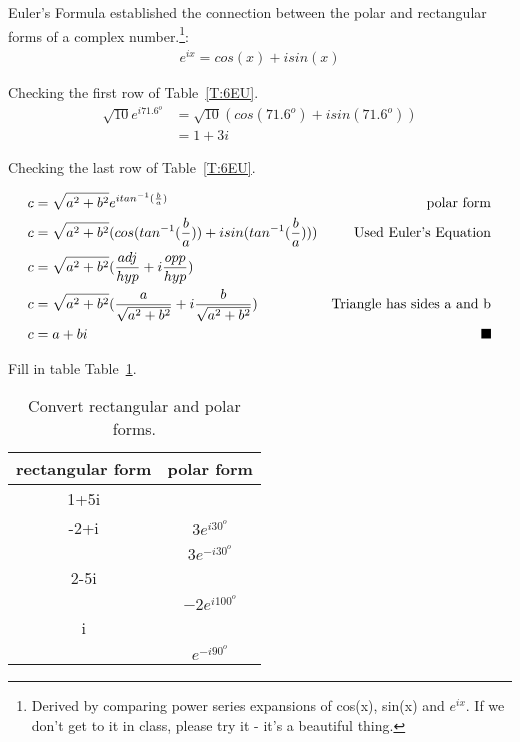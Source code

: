 Euler's Formula established the connection between the polar and rectangular forms of a complex number.\footnote{Derived by comparing power series expansions of cos(x), sin(x) and $e^{ix}$. If we don't get to it in class, please try it - it's a beautiful thing.}:
\begin{align}
 e^{ix}=cos(x)+isin(x) \tag{Euler's Formula}
\end{align}

Checking the first row of Table~\ref{T:6EU}.
\begin{align*}
 \sqrt{10}e^{i71.6^o}&=\sqrt{10}(cos(71.6^o)+isin(71.6^o))\\
&=1+3i
\end{align*}

Checking the last row of Table~\ref{T:6EU}.

\begin{align*}
c&=\sqrt{a^2+b^2}e^{itan^{-1}(\frac{b}{a})} &\text{polar form}\\
c&=\sqrt{a^2+b^2}(cos(tan^{-1}(\frac{b}{a}))+isin(tan^{-1}(\frac{b}{a}))) &\text{Used Euler's Equation}\\
c&=\sqrt{a^2+b^2}(\frac{adj}{hyp}+i\frac{opp}{hyp})\\
c&=\sqrt{a^2+b^2}(\frac{a}{\sqrt{a^2+b^2}}+i\frac{b}{\sqrt{a^2+b^2}})&\text{Triangle has sides a and b} \\
c&=a+bi &\rule{1.6ex}{1.6ex}
\end{align*}

\begin{blevel}
Fill in table Table~\ref{T:convert}.
\end{blevel}

\begin{table}[H]
\begin{center}
\begin{tabular}{|c|c|} \hline
rectangular form	&polar form\\ \hline
1+5i & \\ \hline
-2+i& $3e^{i30^o}$\\ \hline
& $3e^{-i30^o}$\\ \hline
2-5i& \\ \hline
& $-2e^{i100^o}$\\ \hline
i& \\ \hline
& $e^{-i90^o}$\\ \hline
\end{tabular}
\caption{Convert rectangular and polar forms.}
\label{T:convert}
\end{center}
\end{table}

